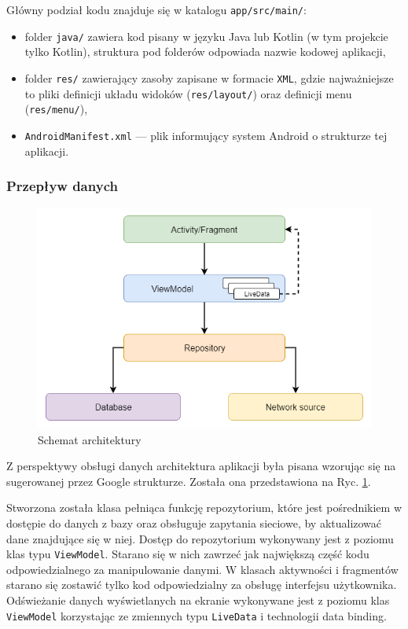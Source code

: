 \documentclass[polish,polish,a4paper,12pt]{article}
\begin{document}
		Główny podział kodu znajduje się w katalogu \texttt{app/src/main/}:

		\begin{itemize}
			\item folder \texttt{java/} zawiera kod pisany w języku Java lub Kotlin (w tym projekcie tylko Kotlin), struktura pod folderów odpowiada nazwie kodowej aplikacji,
			\item folder \texttt{res/} zawierający zasoby zapisane w formacie \texttt{XML}, gdzie najważniejsze to pliki definicji układu widoków (\texttt{res/layout/}) oraz definicji menu (\texttt{res/menu/}),
			\item \texttt{AndroidManifest.xml} — plik informujący system Android o strukturze tej aplikacji.
		\end{itemize}

		\subsubsection{Przepływ danych}

		\begin{figure}[H]
			\centering
			\includegraphics[width = \textwidth]{architecture}
			\caption{Schemat architektury}
			\label{fig:architecture}
		\end{figure}

		Z perspektywy obsługi danych architektura aplikacji była pisana wzorując się na sugerowanej przez Google strukturze. Została ona przedstawiona na Ryc. \ref{fig:architecture}.

		Stworzona została klasa pełniąca funkcję repozytorium, które jest pośrednikiem w dostępie do danych z bazy oraz obsługuje zapytania sieciowe, by aktualizować dane znajdujące się w niej. Dostęp do repozytorium wykonywany jest z poziomu klas typu \texttt{ViewModel}. Starano się w nich zawrzeć jak największą część kodu odpowiedzialnego za manipulowanie danymi. W klasach aktywności i fragmentów starano się zostawić tylko kod odpowiedzialny za obsługę interfejsu użytkownika. Odświeżanie danych wyświetlanych na ekranie wykonywane jest z poziomu klas \texttt{ViewModel} korzystając ze zmiennych typu \texttt{LiveData} i technologii data binding.
\end{document}
